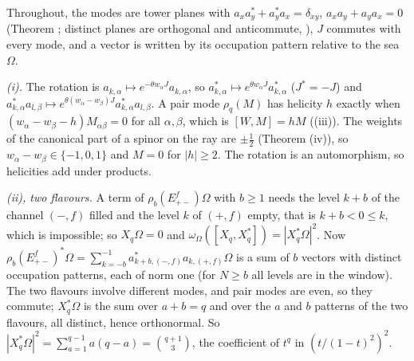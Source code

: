 Throughout, the modes are tower planes with $a_{x}a_{y}^{*} + a_{y}^{*}a_{x} = \delta_{xy}$, $a_{x}a_{y} + a_{y}a_{x} = 0$ (Theorem ; distinct planes are orthogonal and anticommute, ), $J$ commutes with every mode, and a vector is written by its occupation pattern relative to the sea $\Omega$.

\emph{(i).} The rotation is $a_{k,\alpha} \mapsto e^{-\theta w_{\alpha}J}a_{k,\alpha}$, so $a_{k,\alpha}^{*} \mapsto e^{\theta w_{\alpha}J}a_{k,\alpha}^{*}$ ($J^{*} = -J$) and $a^{*}_{k,\alpha}a_{l,\beta} \mapsto e^{\theta(w_{\alpha} - w_{\beta})J}a^{*}_{k,\alpha}a_{l,\beta}$. A pair mode $\rho_{q}(M)$ has helicity $h$ exactly when $(w_{\alpha} - w_{\beta} - h)M_{\alpha\beta} = 0$ for all $\alpha, \beta$, which is $[W, M] = hM$ ((iii)). The weights of the canonical part of a spinor on the ray are $\pm\tfrac12$ (Theorem (iv)), so $w_{\alpha} - w_{\beta} \in \{-1, 0, 1\}$ and $M = 0$ for $|h| \ge 2$. The rotation is an automorphism, so helicities add under products.

\emph{(ii), two flavours.} A term of $\rho_{b}(E^{f}_{+-})\Omega$ with $b \ge 1$ needs the level $k + b$ of the channel $(-, f)$ filled and the level $k$ of $(+, f)$ empty, that is $k + b < 0 \le k$, which is impossible; so $X_{q}\Omega = 0$ and $\omega_{\Omega}([X_{q}, X_{q}^{*}]) = |X_{q}^{*}\Omega|^{2}$. Now $\rho_{b}(E^{f}_{+-})^{*}\Omega = \sum_{k=-b}^{-1}a^{*}_{k+b,(-,f)}a_{k,(+,f)}\Omega$ is a sum of $b$ vectors with distinct occupation patterns, each of norm one (for $N \ge b$ all levels are in the window). The two flavours involve different modes, and pair modes are even, so they commute; $X_{q}^{*}\Omega$ is the sum over $a + b = q$ and over the $a$ and $b$ patterns of the two flavours, all distinct, hence orthonormal. So $|X_{q}^{*}\Omega|^{2} = \sum_{a=1}^{q-1}a(q - a) = \binom{q+1}{3}$, the coefficient of $t^{q}$ in $(t/(1 - t)^{2})^{2}$.

